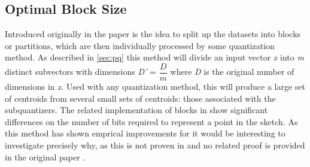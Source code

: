 \subsection{Optimal Block Size}
Introduced originally in the paper \cite{schmid9} is the idea to split up the datasets into blocks or partitions, which are then individually processed by some quantization method. As described in \ref{sec:pq} this method will divide an input vector \textit{x} into \textit{m} distinct subvectors with dimensions \textit{D'} = $\dfrac{D}{m}$ where \textit{D} is the original number of dimensions in \textit{x}. Used with any quantization method, this will produce a large set of centroids from several small sets of centroids: those associated with the subquantizers. The related implementation of blocks in \cite{wagner17} show significant differences on the number of bits required to represent a point in the sketch. As this method has shown emprical improvements for \qs{} it would be interesting to investigate precisely why, as this is not proven in \cite{wagner17} and no related proof is provided in the original paper \cite{schmid9}. 